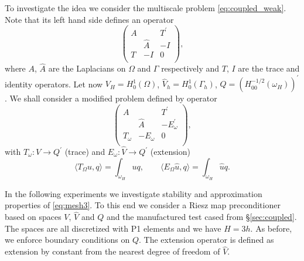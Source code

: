 \documentclass[r]{siamart171218}
\begin{document}
To investigate the idea we consider the multiscale problem \eqref{eq:coupled_weak}.
Note that its left hand side defines an operator
%
\[
\begin{pmatrix}
  A & & T^{\prime}\\
  & \hat{A} & -I\\
  T & -I & 0\\
\end{pmatrix},
\]
where $A$, $\hat{A}$ are the Laplacians on $\Omega$ and $\Gamma$ respectively
and $T$, $I$ are the trace and identity operators. Let now $V_H=H^{1}_0(\Omega)$,
$\hat{V}_h=H^{1}_0(\Gamma_h)$, $Q=(H^{-1/2}_{00}(\omega_H))^{\prime}$. We shall
consider a modified problem defined by operator
%
\begin{equation}\label{eq:mesh3}
\begin{pmatrix}
  A & & T^{\prime}\\
  & \hat{A} & -E^{\prime}_{\omega}\\
  T_{\omega} & -E_{\omega} & 0\\
\end{pmatrix},
\end{equation}
%
with $T_{\omega}: V\rightarrow Q^{\prime}$ (trace) and $E_{\omega}: \hat{V}\rightarrow Q^{\prime}$
(extension)
\[
\langle T_{\Omega} u, q\rangle = \int_{\omega_H} uq, \quad\quad
%
\langle E_{\Omega} \hat{u}, q\rangle = \int_{\omega_H} \hat{u} q.
\]
%

In the following experiments we investigate stability and approximation
properties of \eqref{eq:mesh3}. To this end we consider a Riesz map preconditioner
based on spaces $V$, $\hat{V}$ and $Q$ and the manufactured test cased from \S \ref{sec:coupled}.
The spaces are all discretized with P1 elements and we have $H=3h$. As before, we enforce boundary
conditions on $Q$. The extension operator is defined as extension by constant
from the nearest degree of freedom of $\hat{V}$.
\end{document}
